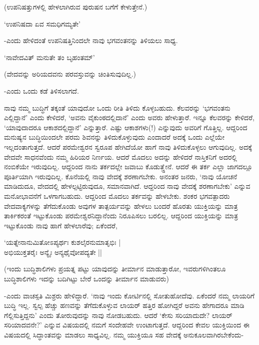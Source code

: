 (ಉಪನಿಷತ್ತುಗಳಲ್ಲಿ ಹೇಳಲಾಗಿರುವ ಪುರುಷನ ಬಗೆಗೆ ಕೇಳುತ್ತೇನೆ.)

\begin{shloka}
`ಉಪನಿಷದಾ ಏವ ಸಮಧಿಗಮ್ಯತೇ'
\end{shloka}

-ಎಂದು ಹೇಳಿದಂತೆ ಉಪನಿಷತ್ತಿನಿಂದಲೇ ನಾವು ಭಗವಂತನನ್ನು ತಿಳಿಯಲು ಸಾಧ್ಯ.

\begin{shloka}
`ನಾವೇದವಿತ್ ಮನುತೇ ತಂ ಬೃಹಂತಮ್'
\end{shloka}

(ವೇದವನ್ನು ಅರಿಯದವನು ಪರವಸ್ತುವನ್ನು ಚಿಂತಿಸುವುದಿಲ್ಲ.)

-ಎಂದು ಒಂದು ಕಡೆ ತಿಳಿಸಲಾಗದೆ.

ನಾವು ನಮ್ಮ ಬುದ್ಧಿಗೆ ತಕ್ಕಂತೆ ಯಾವುದೋ ಒಂದು ರೀತಿ ತಿಳಿದು ಕೊಳ್ಳಬಹುದು. ಕೆಲವರನ್ನು `ಭಗವಂತನು ಎಲ್ಲಿದ್ದಾನೆ' ಎಂದು ಕೇಳಿದರೆ, `ಅವನು ವೈಕುಂಠದಲ್ಲಿದಾನೆ' ಎಂದು ಅವರು ಹೇಳುತ್ತಾರೆ. ಇನ್ನೂ ಕೆಲವರನ್ನು ಕೇಳಿದರೆ, `ಯಾವುದಾದರೂ ಆಕಾಶದಲ್ಲಿದ್ದಾನೆ' ಎನ್ನುತ್ತಾರೆ. ಎಷ್ಟು ಆಕಾಶಗಳು(!) ಎನ್ನುವುದು ಅವರಿಗೆ ಗೊತ್ತಿಲ್ಲ. ಆದ್ದರಿಂದ ಮನುಷ್ಯನ ಬುದ್ಧಿಯಿಂದಲೇ ಪರಮ ಶಿವನನ್ನು ತಿಳಿದುಕೊಳ್ಳುವುದು ಎಂದಾದರೆ ಅದಕ್ಕೆ ಒಂದು ಎಲ್ಲೆಯೇ ಇಲ್ಲದಂತಾಗುತ್ತದೆ. ಆದರೆ ಪರಮೇಶ್ವರನ ಸ್ವರೂಪ ಹೇಗಿದೆಯೋ ಹಾಗೆ ನಾವು ತಿಳಿದುಕೊಳ್ಳಲು ಆಗುವುದಿಲ್ಲ. ಅದಕ್ಕೆ ವೇದವೇ ಸಾಧನವೆಂದು ನಮ್ಮ ಹಿರಿಯರ ನಿರ್ಣಯ. ಆದರೆ ಮೊದಲು ಅದನ್ನು ಹೇಳಿದರೆ ನಾಸ್ತಿಕನಿಗೆ ಅದರಲ್ಲಿ ನಂಬಿಕೆಯೇ ಇರುವುದಿಲ್ಲ. ಆದ್ದರಿಂದ ನಾನು ತರ್ಕದಲ್ಲೇ ಜವಾಬು ಕೊಡುತ್ತ್ತೇನೆ. ಆದರೆ ಈ ತರ್ಕ ಎಲ್ಲಾ ಜಾಗದಲ್ಲೂ ಪೂರ್ತಿಯಾಗಿ ಇರುವುದಿಲ್ಲ. ಕೊನೆಯಲ್ಲಿ ನಾವು ವೇದಕ್ಕೆ ಶರಣಾಗಬೇಕು. ಅನಂತರ ಜನರು, `ನಾವು ಯೋಚನೆ ಮಾಡಿದುದೂ, ವೇದದಲ್ಲಿ ಹೇಳಲ್ಪಟ್ಟಿರುವುದೂ, ಸಮಾನವಾಗಿದೆ. ಆದ್ದರಿಂದ ನಾವು ವೇದಕ್ಕೆ ಶರಣಾಗಬೇಕು' ಎನ್ನುವ ಮನೋಭಾವನೆಗೆ ಒಳಗಾಗಬಹುದು. ಆದ್ದರಿಂದ ಮೊದಲು ತರ್ಕವನ್ನು ಹೇಳಬೇಕು. ಶಂಕರ ಭಗವತ್ಪಾದರು ವೇದವಾಕ್ಯಗಳನ್ನು ತೆಗೆದುಕೊಂಡು ಅವುಗಳ ತಾತ್ಪರ್ಯವನ್ನು ಹೇಳಲು ಬಂದರೆ ಹೊರತು ಯುಕ್ತಿಯನ್ನು ಮಾತ್ರ ತಾರ್ಕಿಕರಂತೆ ಇಟ್ಟುಕೊಂಡು ಪರಮೇಶ್ವರನಿದ್ದಾನೆಂದು ನಿರೂಪಿಸಲು ಬರಲಿಲ್ಲ. ಆದ್ದರಿಂದ ಯುಕ್ತಿಯನ್ನು ಮಾತ್ರ ಇಟ್ಟುಕೊಂಡು ನಾವು ಹಾಗೆ ಹೇಳಲಾರೆವು; ಏಕೆಂದರೆ, 

\begin{shloka}
`ಯತ್ನೇನಾನುಮಿತೋಽಪ್ಯರ್ಥಃ ಕುಶಲೈರನುಮಾತೃಭಿಃ |\\
ಅಭಿಯುಕ್ತತರೈಃ ಅನ್ಯೈಃ ಅನ್ಯಥೈವೋಪದ್ಯತೇ ||
\end{shloka}

(ಇಂದು ಬುದ್ಧಿಶಾಲಿಗಳು ಪ್ರಯತ್ನ ಪಟ್ಟು ಯಾವುದನ್ನು ತೀರ್ಮಾನ ಮಾಡುತ್ತಾರೋ, ಇವರುಗಳಿಗಿಂತಲೂ ಬುದ್ಧಿಶಾಲಿಗಳು ಇದನ್ನು ಬದಿಗಿಟ್ಟು ಬೇರೆ ಒಂದನ್ನು ತೀರ್ಮಾನ ಮಾಡುವರು)

-ಎಂದು ವಾಚಸ್ಪತಿ ಮಿಶ್ರರು ಹೇಳಿದ್ದಾರೆ. `ನಾವು ಇಂದು ಕೋರ್ಟಿನಲ್ಲಿ ಸೋತುಹೋದೆವು. ಏಕೆಂದರೆ ನಮ್ಮ ಲಾಯರಿಗೆ ಬುದ್ಧಿ ಇಲ್ಲ. ಸ್ವಲ್ಪ ಹೆಚ್ಚು ಹಣವನ್ನು ತೆಗೆದುಕೊಳ್ಳುವ ಲಾಯರ್ ಹತ್ತಿರ ಹೋಗಿದ್ದರೆ ಅವನು ಹೇಗಾದರೂ ಮಾಡಿ ಗೆಲ್ಲಿಸುತ್ತಿದ್ದನು' ಎಂದು ತೋರುವುದನ್ನು ನಾವು ನೋಡಬಹುದು. ಆದರೆ `ಕೇಸು ಸರಿಯಾದುದೇ? ಲಾಯರ್ ಸರಿಯಾದವನೇ?' ಎನ್ನುವ ವಿಷಯದಲ್ಲಿ ನಮಗೆ ಸಂದೇಹವೇ ಉಂಟಾಗುತ್ತದೆ. ಆದ್ದರಿಂದ ಕೇವಲ ಯುಕ್ತಿಯಿಂದ ಈ ವಿಷಯದಲ್ಲಿ ಸಿದ್ಧಾಂತವನ್ನು ಮಾಡಲು ಸಾಧ್ಯವಿಲ್ಲ. ನಮ್ಮ ಯುಕ್ತಿಯೂ ಸಹ ವೇದಕ್ಕೆ ಅನುಕೂಲವಾಗಿರಬೇಕೆಂದು-

